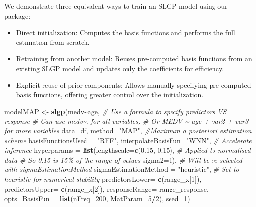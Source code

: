 \documentclass[
]{article}
\newenvironment{Shaded}{\begin{snugshade}}{\end{snugshade}}
\newcommand{\AttributeTok}[1]{\textcolor[rgb]{0.13,0.29,0.53}{#1}}
\newcommand{\CommentTok}[1]{\textcolor[rgb]{0.56,0.35,0.01}{\textit{#1}}}
\newcommand{\DecValTok}[1]{\textcolor[rgb]{0.00,0.00,0.81}{#1}}
\newcommand{\FloatTok}[1]{\textcolor[rgb]{0.00,0.00,0.81}{#1}}
\newcommand{\FunctionTok}[1]{\textcolor[rgb]{0.13,0.29,0.53}{\textbf{#1}}}
\newcommand{\NormalTok}[1]{#1}
\newcommand{\OtherTok}[1]{\textcolor[rgb]{0.56,0.35,0.01}{#1}}
\newcommand{\SpecialCharTok}[1]{\textcolor[rgb]{0.81,0.36,0.00}{\textbf{#1}}}
\newcommand{\StringTok}[1]{\textcolor[rgb]{0.31,0.60,0.02}{#1}}
\begin{document}
We demonstrate three equivalent ways to train an SLGP model using our package:

\begin{itemize}
\item
  Direct initialization: Computes the basis functions and performs the full estimation from scratch.
\item
  Retraining from another model: Reuses pre-computed basis functions from an existing SLGP model and updates only the coefficients for efficiency.
\item
  Explicit reuse of prior components: Allows manually specifying pre-computed basis functions, offering greater control over the initialization.
\end{itemize}

\begin{Shaded}
\begin{Highlighting}[]
\NormalTok{modelMAP }\OtherTok{\textless{}{-}} \FunctionTok{slgp}\NormalTok{(medv}\SpecialCharTok{\textasciitilde{}}\NormalTok{age, }\CommentTok{\# Use a formula to specify predictors VS response}
                 \CommentTok{\# Can use medv\textasciitilde{}. for all variables,}
                 \CommentTok{\# Or \textquotesingle{}MEDV\textquotesingle{} \textasciitilde{} age + var2 + var3 for more variables}
                 \AttributeTok{data=}\NormalTok{df,}
                 \AttributeTok{method=}\StringTok{"MAP"}\NormalTok{, }\CommentTok{\#Maximum a posteriori estimation scheme}
                 \AttributeTok{basisFunctionsUsed =} \StringTok{"RFF"}\NormalTok{,}
                 \AttributeTok{interpolateBasisFun=}\StringTok{"WNN"}\NormalTok{, }\CommentTok{\# Accelerate inference}
                 \AttributeTok{hyperparams =} \FunctionTok{list}\NormalTok{(}\AttributeTok{lengthscale=}\FunctionTok{c}\NormalTok{(}\FloatTok{0.15}\NormalTok{, }\FloatTok{0.15}\NormalTok{), }
                                    \CommentTok{\# Applied to normalised data}
                                    \CommentTok{\# So 0.15 is 15\% of the range of values}
                                    \AttributeTok{sigma2=}\DecValTok{1}\NormalTok{), }
                 \CommentTok{\# Will be re{-}selected with sigmaEstimationMethod}
                 \AttributeTok{sigmaEstimationMethod =} \StringTok{"heuristic"}\NormalTok{, }
                 \CommentTok{\# Set to heuristic for numerical stability                 }
                 \AttributeTok{predictorsLower=} \FunctionTok{c}\NormalTok{(range\_x[}\DecValTok{1}\NormalTok{]),}
                 \AttributeTok{predictorsUpper=} \FunctionTok{c}\NormalTok{(range\_x[}\DecValTok{2}\NormalTok{]),}
                 \AttributeTok{responseRange=}\NormalTok{ range\_response,}
                 \AttributeTok{opts\_BasisFun =} \FunctionTok{list}\NormalTok{(}\AttributeTok{nFreq=}\DecValTok{200}\NormalTok{,}
                                      \AttributeTok{MatParam=}\DecValTok{5}\SpecialCharTok{/}\DecValTok{2}\NormalTok{),}
                 \AttributeTok{seed=}\DecValTok{1}\NormalTok{)}
\end{Highlighting}
\end{Shaded}
\end{document}
